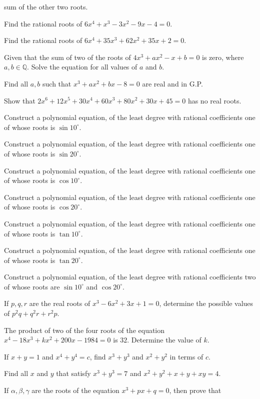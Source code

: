   sum of the other two roots.
\item Find the rational roots of $6x^4 + x^3 - 3x^2 - 9x - 4 = 0$.
\item Find the rational roots of $6x^4 + 35x^3 + 62x^2 + 35x + 2 = 0$.
\item Given that the sum of two of the roots of $4x^3 + ax^2 - x + b = 0$ is zero, where $a,
  b\in\mathbb{Q}$. Solve the equation for all values of $a$ and $b$.
\item Find all $a, b$ such that $x^3 + ax^2 + bx - 8 = 0$ are real and in G.P.
\item Show that $2x^6 + 12x^5 + 30x^4 + 60x^3 + 80x^2 + 30x + 45 = 0$ has no real roots.
\item Construct a polynomial equation, of the least degree with rational coefficients one of whose roots is
  $\sin10^\circ$.
\item Construct a polynomial equation, of the least degree with rational coefficients one of whose roots is
  $\sin20^\circ$.
\item Construct a polynomial equation, of the least degree with rational coefficients one of whose roots is
  $\cos10^\circ$.
\item Construct a polynomial equation, of the least degree with rational coefficients one of whose roots is
  $\cos20^\circ$.
\item Construct a polynomial equation, of the least degree with rational coefficients one of whose roots is
  $\tan10^\circ$.
\item Construct a polynomial equation, of the least degree with rational coefficients one of whose roots is
  $\tan20^\circ$.
\item Construct a polynomial equation, of the least degree with rational coefficients two of whose roots are
  $\sin10^\circ$ and $\cos20^\circ$.
\item If $p, q, r$ are the real roots of $x^3 - 6x^2 + 3x + 1 = 0$, determine the possible values of $p^2q +
  q^2r + r^2p$.
\item The product of two of the four roots of the equation $x^4 - 18x^3 + kx^2 + 200x -1984 = 0$ is
  $32$. Determine the value of $k$.
\item If $x + y = 1$ and $x^4 + y^4 = c$, find $x^3 + y^3$ and $x^2 + y^2$ in terms of $c$.
\item Find all $x$ and $y$ that satisfy $x^3 + y^3 = 7$ and $x^2 + y^2 + x + y + xy = 4$.
\item If $\alpha, \beta, \gamma$ are the roots of the equation $x^3 + px + q = 0$, then prove that
